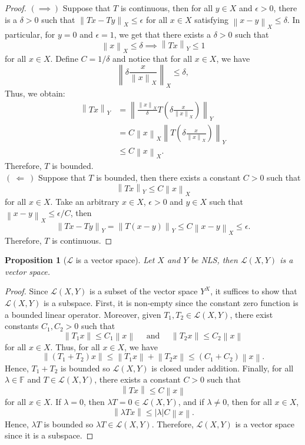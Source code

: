 \documentclass{article}
\newtheorem*{proposition}{Proposition}
\newcommand{\F}{\mathbb{F}}
\renewcommand{\L}{\mathcal{L}}
\newcommand{\lnorm}[2]{\left\lVert#2 \right\rVert_{#1}}
\newcommand{\norm}[1]{\left\lVert#1 \right\rVert}
\begin{document}
\begin{proof}
    $( \implies )$ Suppose that $T$ is continuous, then for all $y \in X$ and $\epsilon > 0$, there is a $\delta > 0$ such that $\lnorm{X}{Tx - Ty} \leq \epsilon$ for all $x \in X$ satisfying $\lnorm{X}{x - y} \leq \delta$. In particular, for $y = 0$ and $\epsilon = 1$, we get that there exists a $\delta > 0$ such that
    $$\lnorm{X}{x} \leq \delta \implies \lnorm{Y}{Tx} \leq 1$$
    for all $x \in X$. Define $C = 1/\delta$ and notice that for all $x \in X$, we have
    $$\lnorm{X}{\delta\frac{x}{\lnorm{X}{x}}} \leq \delta,$$
    Thus, we obtain:
    \begin{align*}
        \lnorm{Y}{Tx} &= \lnorm{Y}{\frac{\lnorm{X}{x}}{\delta}T\left(\delta\frac{x}{\lnorm{X}{x}}\right)} \\
        &= C\lnorm{X}{x} \lnorm{Y}{T\left(\delta\frac{x}{\lnorm{X}{x}}\right)} \\
        &\leq C \lnorm{X}{x}.
    \end{align*}
    Therefore, $T$ is bounded. \\
    $( \ \Longleftarrow \ )$ Suppose that $T$ is bounded, then there exists a constant $C > 0$ such that
    $$\lnorm{Y}{Tx} \leq C \lnorm{X}{x}$$
    for all $x \in X$. Take an arbitrary $x \in X$, $\epsilon > 0$ and $y \in X$ such that $\lnorm{X}{x - y} \leq \epsilon/C$, then
    $$\lnorm{Y}{Tx - Ty} = \lnorm{Y}{T(x - y)} \leq C\lnorm{X}{x - y} \leq \epsilon.$$
    Therefore, $T$ is continuous.
\end{proof}

\begin{proposition}[$\L$ is a vector space]
    Let $X$ and $Y$ be NLS, then $\L(X,Y)$ is a vector space.
\end{proposition}

\begin{proof}
    Since $\L(X,Y)$ is a subset of the vector space $Y^X$, it suffices to show that $\L(X,Y)$ is a subspace. First, it is non-empty since the constant zero function is a bounded linear operator. Moreover, given $T_1, T_2 \in \L(X,Y)$, there exist constants $C_1, C_2 > 0$ such that
    $$\norm{T_1x} \leq C_1 \norm{x} \quad \text{ and } \quad \norm{T_2x} \leq C_2 \norm{x}$$
    for all $x \in X$. Thus, for all $x \in X$, we have
    $$\norm{(T_1 + T_2)x} \leq \norm{T_1x} + \norm{T_2x} \leq (C_1 + C_2)\norm{x}.$$
    Hence, $T_1 + T_2$ is bounded so $\L(X,Y)$ is closed under addition. Finally, for all $\lambda \in \F$ and $T \in \L(X,Y)$, there exists a constant $C > 0$ such that
    $$\norm{Tx} \leq C \norm{x}$$
    for all $x \in X$. If $\lambda = 0$, then $\lambda T = 0 \in \L(X,Y)$, and if $\lambda \neq 0$, then for all $x \in X$, 
    $$\norm{\lambda Tx} \leq |\lambda| C \norm{x}.$$  
    Hence, $\lambda T $ is bounded so $\lambda T \in \L(X,Y)$. Therefore, $\L(X,Y)$ is a vector space since it is a subspace.  
\end{proof}
\end{document}
